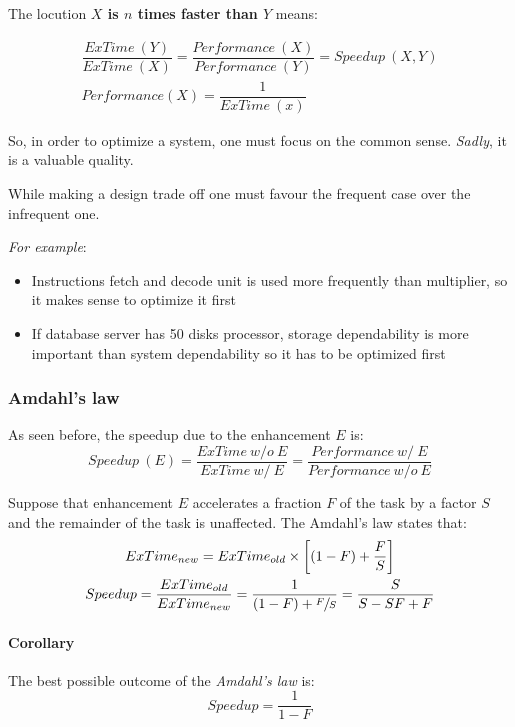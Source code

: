 \documentclass[english]{article}
\begin{document}
\bigskip
The locution \textbf{\(X\) is \(n\) times faster than \(Y\)} means:

\begin{gather*}
  \dfrac{ExTime\ (Y)}{ExTime\ (X)}  = \dfrac{Performance\ (X)}{Performance\ (Y)} = Speedup\ (X, Y) \\
  Performance(X) = \dfrac{1}{ExTime\ (x)}
\end{gather*}

So, in order to optimize a system, one must focus on the common sense.
\textit{Sadly}, it is a valuable quality.

While making a design trade off one must favour the frequent case over the infrequent one.

\textit{For example}:
\begin{itemize}
  \item Instructions fetch and decode unit is used more frequently than multiplier, so it makes sense to optimize it first
  \item If database server has 50 disks processor, storage dependability is more important than system dependability so it has to be optimized first
\end{itemize}

\subsubsection{Amdahl's law}

As seen before, the speedup due to the enhancement \(E\) is:
\[ Speedup\ (E)  = \dfrac{ExTime\ w/o\ E}{ExTime\ w/\ E} = \dfrac{Performance\ w/\ E}{Performance\ w/o\ E} \]

Suppose that enhancement \(E\) accelerates a fraction \(F\) of the task by a factor \(S\) and the remainder of the task is unaffected.
The Amdahl's law states that:
\begin{gather*}
  ExTime_{new} = ExTime_{old} \times \left[\left(1 - F\right) + \dfrac{F}{S}\right] \\
  Speedup = \dfrac{ExTime_{old}}{ExTime_{new}} = \dfrac{1}{(1 - F) + \sfrac{F}{S}} = \dfrac{S}{S - SF + F}
\end{gather*}

\paragraph{Corollary}

The best possible outcome of the \textit{Amdahl's law} is:
\[ Speedup = \dfrac{1}{1 - F} \]
\end{document}
